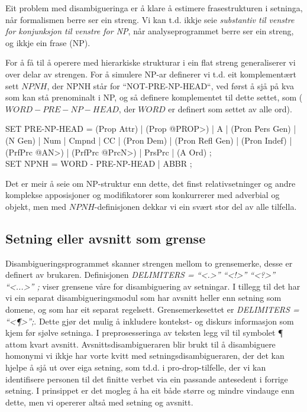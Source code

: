 \documentclass[a4paper,norsk]{article}
\begin{document}
Eit problem med disambigueringa er å klare å estimere frasestrukturen i setninga, når formalismen berre ser ein streng. Vi kan t.d. ikkje seie \textit{substantiv til venstre for konjunksjon til venstre for NP}, når analyseprogrammet berre ser ein streng, og ikkje ein frase (NP). %

For å få til å operere med hierarkiske strukturar i ein flat streng generaliserer vi over delar av strengen. For å simulere NP-ar definerer vi t.d. eit komplementært sett $NPNH$, der NPNH står for ``NOT-PRE-NP-HEAD``, ved først å sjå på kva som kan stå prenominalt i NP, og så definere komplementet til dette settet, som ($WORD - PRE-NP-HEAD$, der $WORD$ er definert som settet av alle ord). %

\begin{example}
SET PRE-NP-HEAD = (Prop Attr) | (Prop @PROP>) | A | (Pron Pers Gen) | (N Gen) | 
                  Num | Cmpnd | CC | (Pron Dem)  | (Pron Refl Gen) | 
                  (Pron Indef) | (PrfPrc @AN>) |  (PrfPrc @PrcN>) | PrsPrc | (A Ord) ; \\
SET NPNH        = WORD - PRE-NP-HEAD | ABBR ; \\                 
\end{example}

Det er meir å seie om NP-struktur enn dette, det finst relativsetninger og andre komplekse apposisjoner og modifikatorer som konkurrerer med adverbial og objekt, men med $NPNH$-definisjonen dekkar vi ein svært stor del av alle tilfella. %

\subsection{Setning eller avsnitt som grense}

Disambigueringsprogrammet skanner strengen mellom to grensemerke, desse er definert av brukaren. Definisjonen \emph{DELIMITERS = ``<.>'' ``<!>'' ``<?>'' ``<...>'' ;} viser grensene våre for disambiguering av setningar. I tillegg til det har vi ein separat disambigueringsmodul som har avsnitt heller enn setning som domene, og som har eit separat regelsett. Grensemerkesettet er \emph{DELIMITERS = ``<¶>'';}. Dette gjør det mulig å inkludere kontekst- og diskurs informasjon som kjem før sjølve setninga. I preprosesseringa av teksten legg vil til symbolet ¶ attom kvart avsnitt. Avsnittsdisambigueraren blir brukt til å disambiguere homonymi vi ikkje har vorte kvitt med setningsdisambigueraren, der det kan hjelpe å sjå ut over eiga setning, som td.d. i pro-drop-tilfelle, der vi kan identifisere personen til det finitte verbet via ein passande antesedent i forrige setning. %
I prinsippet er det mogleg å ha eit både større og mindre vindauge enn dette, men vi opererer altså med setning og avsnitt. %
\end{document}
